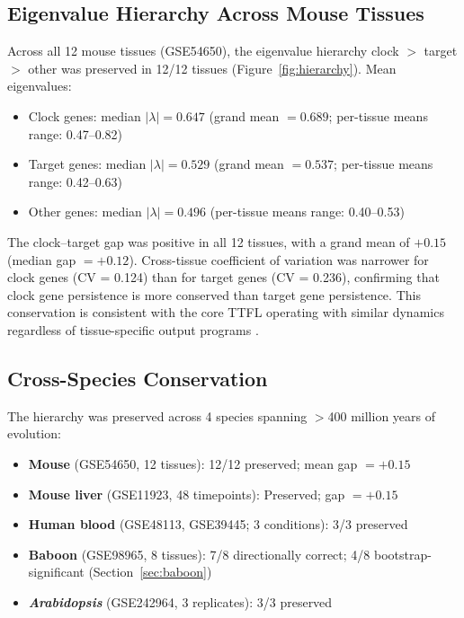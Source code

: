 \documentclass[11pt,letterpaper]{article}
\begin{document}
\subsection{Eigenvalue Hierarchy Across Mouse Tissues}

Across all 12 mouse tissues (GSE54650), the eigenvalue hierarchy clock $>$ target $>$ other was preserved in 12/12 tissues (Figure~\ref{fig:hierarchy}). Mean eigenvalues:
\begin{itemize}
\item Clock genes: median $|\lambda| = 0.647$ (grand mean $= 0.689$; per-tissue means range: 0.47--0.82)
\item Target genes: median $|\lambda| = 0.529$ (grand mean $= 0.537$; per-tissue means range: 0.42--0.63)
\item Other genes: median $|\lambda| = 0.496$ (per-tissue means range: 0.40--0.53)
\end{itemize}

The clock--target gap was positive in all 12 tissues, with a grand mean of $+0.15$ (median gap $= +0.12$). Cross-tissue coefficient of variation was narrower for clock genes (CV = 0.124) than for target genes (CV = 0.236), confirming that clock gene persistence is more conserved than target gene persistence. This conservation is consistent with the core TTFL operating with similar dynamics regardless of tissue-specific output programs \citep{zhang2014circadian}.

\subsection{Cross-Species Conservation}
\label{sec:cross-species}

The hierarchy was preserved across 4 species spanning $>$400 million years of evolution:
\begin{itemize}
\item \textbf{Mouse} (GSE54650, 12 tissues): 12/12 preserved; mean gap $= +0.15$
\item \textbf{Mouse liver} (GSE11923, 48 timepoints): Preserved; gap $= +0.15$
\item \textbf{Human blood} (GSE48113, GSE39445; 3 conditions): 3/3 preserved
\item \textbf{Baboon} (GSE98965, 8 tissues): 7/8 directionally correct; 4/8 bootstrap-significant (Section~\ref{sec:baboon})
\item \textbf{\textit{Arabidopsis}} (GSE242964, 3 replicates): 3/3 preserved
\end{itemize}
\end{document}
